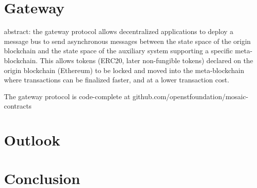 \documentclass[12pt,a4paper]{article}
\begin{document}

\section{Gateway}

abstract:
the gateway protocol allows decentralized applications to deploy a message bus to send asynchronous messages between the state space of the origin blockchain and the state space of the auxiliary system supporting a specific meta-blockchain.
This allows tokens (ERC20, later non-fungible tokens) declared on the origin blockchain (Ethereum) to be locked and moved into the meta-blockchain where transactions can be finalized faster, and at a lower transaction cost. 

The gateway protocol is code-complete at github.com/openstfoundation/mosaic-contracts

%
%
\section{Outlook}

%
%
\section{Conclusion}







\end{document}
